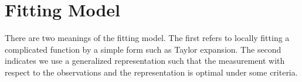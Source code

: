 \documentclass{article}
\theoremstyle{remark}
\begin{document}
%
\section{Fitting Model}
There are two meanings of the fitting model. The first refers to locally fitting a complicated function by a simple form such as Taylor expansion. The second indicates we use a generalized representation such that the measurement with respect to the observations and the representation is optimal under some criteria.  
\end{document}
